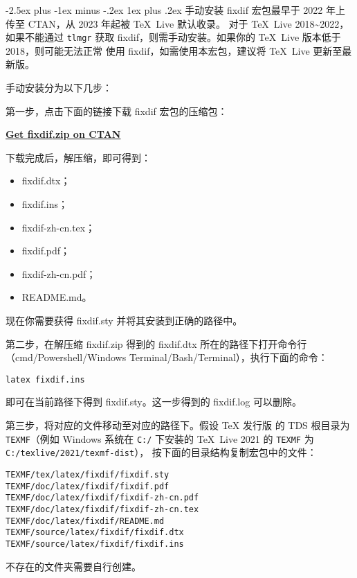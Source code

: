 \documentclass[letterpaper,11pt]{article}
\makeatletter
\DeclareRobustCommand\pkg{\textsf}
\renewcommand\section{\@startsection{section}{1}{\z@}%
  {-2.5ex plus -1ex minus -.2ex}%
  {1ex plus .2ex}%
  {\normalfont\Large\bfseries\color{titlecolor}}}
\makeatother
\begin{document}
\section{手动安装}
\pkg{fixdif} 宏包最早于 2022 年上传至 CTAN，从 2023 年起被 \TeX\ Live 默认收录。
对于 \TeX\ Live 2018\textasciitilde2022， 如果不能通过 \texttt{tlmgr} 获取 
\pkg{fixdif}，则需手动安装。如果你的 \TeX\ Live 版本低于 2018，则可能无法正常
使用 \pkg{fixdif}，如需使用本宏包，建议将 \TeX\ Live 更新至最新版。

手动安装分为以下几步：

\textcolor{titlecolor}{第一步，}点击下面的链接下载 \pkg{fixdif} 宏包的压缩包：
\begin{center}
\hyperref{https://mirrors.ctan.org/macros/latex/contrib/fixdif.zip}{}{}%
  {\bfseries Get \pkg{fixdif}.zip on CTAN}
\end{center}
下载完成后，解压缩，即可得到：
\begin{itemize}[itemsep=0pt,parsep=0pt]
\item \pkg{fixdif}.dtx；
\item \pkg{fixdif}.ins；
\item \pkg{fixdif}-zh-cn.tex；
\item \pkg{fixdif}.pdf；
\item \pkg{fixdif}-zh-cn.pdf；
\item README.md。
\end{itemize}
现在你需要获得 \pkg{fixdif}.sty 并将其安装到正确的路径中。

\textcolor{titlecolor}{第二步，}在解压缩 \pkg{fixdif}.zip 得到的 
\pkg{fixdif}.dtx 所在的路径下打开命令行
（cmd/Powershell/Windows Terminal/Bash/Terminal），执行下面的命令：
\begin{Verbatim}[formatcom=\bfseries]
latex fixdif.ins
\end{Verbatim}
即可在当前路径下得到 \pkg{fixdif}.sty。这一步得到的 \pkg{fixdif}.log 可以删除。

\textcolor{titlecolor}{第三步，}将对应的文件移动至对应的路径下。假设 \TeX{} 发行版
的 TDS 根目录为 \texttt{TEXMF}（例如 Windows 系统在 \texttt{C:/} 下安装的 
\TeX\ Live 2021 的 \texttt{TEXMF} 为 \texttt{C:/texlive/2021/texmf-dist}），
按下面的目录结构复制宏包中的文件：
\begin{Verbatim}
TEXMF/tex/latex/fixdif/fixdif.sty
TEXMF/doc/latex/fixdif/fixdif.pdf
TEXMF/doc/latex/fixdif/fixdif-zh-cn.pdf
TEXMF/doc/latex/fixdif/fixdif-zh-cn.tex
TEXMF/doc/latex/fixdif/README.md
TEXMF/source/latex/fixdif/fixdif.dtx
TEXMF/source/latex/fixdif/fixdif.ins
\end{Verbatim}
不存在的文件夹需要自行创建。
\end{document}

